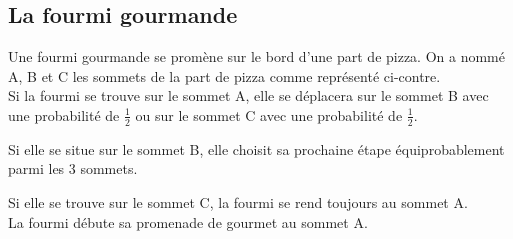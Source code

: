 \documentclass[oneside,12pt]{article}          %
\begin{document}
\subsection{La fourmi gourmande}

\begin{minipage}{0.6\linewidth}
    Une fourmi gourmande se promène sur le bord d'une part de pizza. On a nommé A, B et C les sommets de la part de pizza comme représenté ci-contre.\\[5pt]
    Si la fourmi se trouve sur le sommet A, elle se déplacera sur le sommet B avec une probabilité de $\frac{1}{2}$ ou sur le sommet C avec une probabilité de $\frac{1}{2}$.
    
    Si elle se situe sur le sommet B, elle choisit sa prochaine étape équiprobablement parmi les 3 sommets.
    
    Si elle se trouve sur le sommet C, la fourmi se rend toujours au sommet A.\\[5pt]
    La fourmi débute sa promenade de gourmet au sommet A.

\end{minipage}
\end{document}
